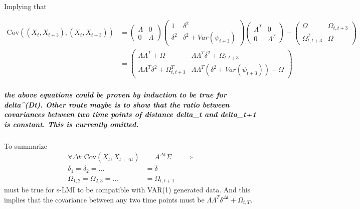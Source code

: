 \documentclass[
  letterpaper,
  DIV=11,
  numbers=noendperiod]{scrartcl}
\let\oldsubparagraph\subparagraph
\renewcommand{\subparagraph}[1]{\oldsubparagraph{#1}\mbox{}}
\begin{document}
Implying that

\[
\begin{align*}
\text{Cov}((X_{t},X_{t+3}),(X_{t},X_{t+3}))
&= 
\begin{pmatrix}    \Lambda & 0
\\   0 & \Lambda \end{pmatrix}  \begin{pmatrix}   1 & \delta^2 
\\   \delta^2& \delta^2+Var(\psi_{t+3}) \end{pmatrix} \begin{pmatrix}    \Lambda^T & 0
\\   0 & \Lambda^T \end{pmatrix} + \begin{pmatrix}   \Omega & \Omega_{t,t+3} 
\\   \Omega_{t,t+3}^T & \Omega 
\end{pmatrix} 
\\
&=
\begin{pmatrix}    
 \Lambda\Lambda^T + \Omega & \Lambda\Lambda^T\delta^2 + \Omega_{t,t+3} \\   
 \Lambda\Lambda^T\delta^2 + \Omega_{t,t+3}^T & \Lambda\Lambda^T(\delta^2+Var(\psi_{t+3})) + \Omega 
\end{pmatrix} 
\end{align*}
\]

\hypertarget{the-above-equations-could-be-proven-by-induction-to-be-true-for-deltadt.-other-route-maybe-is-to-show-that-the-ratio-between-covariances-between-two-time-points-of-distance-delta_t-and-delta_t1-is-constant.-this-is-currently-omitted.}{%
\subparagraph{the above equations could be proven by induction to be
true for delta\^{}(Dt). Other route maybe is to show that the ratio
between covariances between two time points of distance delta\_t and
delta\_t+1 is constant. This is currently
omitted.}\label{the-above-equations-could-be-proven-by-induction-to-be-true-for-deltadt.-other-route-maybe-is-to-show-that-the-ratio-between-covariances-between-two-time-points-of-distance-delta_t-and-delta_t1-is-constant.-this-is-currently-omitted.}}

To summarize \[
\begin{align*}
\forall\Delta t:\text{Cov}(X_t,X_{t+\Delta t})&=A^{\Delta t}\Sigma&&\Rightarrow
\\
\delta_1=\delta_2=...&=\delta
\\
\Omega_{1,2}=\Omega_{2,3}=...&=\Omega_{t,t+1}
\end{align*}
\] must be true for s-LMI to be compatible with VAR(1) generated data.
And this implies that the covariance between any two time points must be
\(\Lambda\Lambda^T\delta^{\Delta t} + \Omega_{t,T}\).
\end{document}

